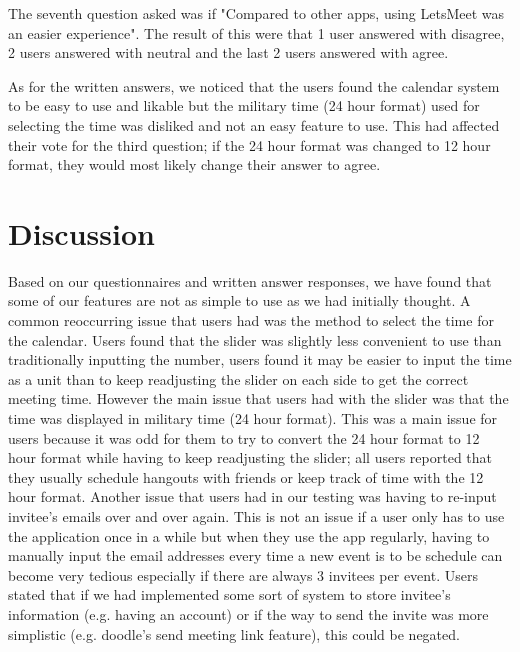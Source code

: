 \documentclass{sigchi}
\begin{document}
The seventh question asked was if "Compared to other apps, using LetsMeet was an easier experience". The result of this were that 1 user answered with disagree, 2 users answered with neutral and the last 2 users answered with agree.

As for the written answers, we noticed that the users found the calendar system to be easy to use and likable but the military time (24 hour format) used for selecting the time was disliked and not an easy feature to use. This had affected their vote for the third question; if the 24 hour format was changed to 12 hour format, they would most likely change their answer to agree.

\section{Discussion}

Based on our questionnaires and written answer responses, we have found that some of our features are not as simple to use as we had initially thought. A common reoccurring issue that users had was the method to select the time for the calendar. Users found that the slider was slightly less convenient to use than traditionally inputting the number, users found it may be easier to input the time as a unit than to keep readjusting the slider on each side to get the correct meeting time. However the main issue that users had with the slider was that the time was displayed in military time (24 hour format). This was a main issue for users because it was odd for them to try to convert the 24 hour format to 12 hour format while having to keep readjusting the slider; all users reported that they usually schedule hangouts with friends or keep track of time with the 12 hour format. Another issue that users had in our testing was having to re-input invitee's emails over and over again. This is not an issue if a user only has to use the application once in a while but when they use the app regularly, having to manually input the email addresses every time a new event is to be schedule can become very tedious especially if there are always 3 invitees per event. Users stated that if we had implemented some sort of system to store invitee's information (e.g. having an account) or if the way to send the invite was more simplistic (e.g. doodle's send meeting link feature), this could be negated.
\end{document}
